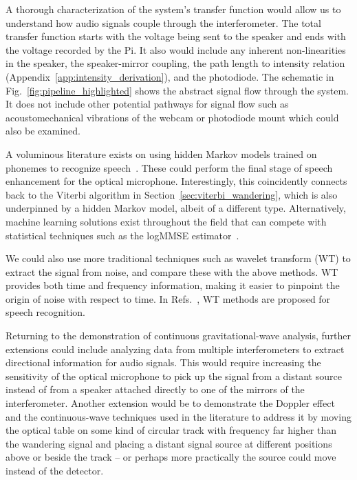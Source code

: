 \documentclass[paper-main.tex]{subfiles}
\begin{document}
A thorough characterization of the system's transfer function would allow us to understand how audio signals couple through the interferometer. 
The total transfer function starts with the voltage being sent to the speaker and ends with the voltage recorded by the Pi. It also would include any inherent non-linearities in the speaker, the speaker-mirror coupling, the path length to intensity relation (Appendix~\ref{app:intensity_derivation}), and the photodiode. The schematic in Fig.~\ref{fig:pipeline_highlighted} shows the abstract signal flow through the system.
It does not include other potential pathways for signal flow such as acoustomechanical vibrations of the webcam or photodiode mount which could also be examined.

A voluminous literature exists on using hidden Markov models trained on phonemes to recognize speech~\cite{HMM_english}. These could perform the final stage of speech enhancement for the optical microphone. Interestingly, this coincidently connects back to the Viterbi algorithm in Section~\ref{sec:viterbi_wandering}, which is also underpinned by a hidden Markov model, albeit of a different type. Alternatively, machine learning solutions exist throughout the field that can compete with statistical techniques such as the logMMSE estimator~\cite{SEGAN}.


We could also use more traditional techniques such as wavelet transform (WT) \citep{nason1995stationary} to extract the signal from noise, and compare these with the above methods. WT provides both time and frequency information, making it easier to pinpoint the origin of noise with respect to time. In Refs.~\cite{tufekci2000feature,agbinya1996discrete}, WT methods are proposed for speech recognition. 

Returning to the demonstration of continuous gravitational-wave analysis, further extensions could include analyzing data from multiple interferometers to extract directional information for audio signals. 
This would require increasing the sensitivity of the optical microphone to pick up the signal from a distant source instead of from a speaker attached directly to one of the mirrors of the interferometer.
Another extension would be to demonstrate the Doppler effect and the continuous-wave techniques used in the literature to address it by moving the optical table on some kind of circular track with frequency far higher than the wandering signal and placing a distant signal source at different positions above or beside the track -- or perhaps more practically the source could move instead of the detector.
\end{document}
